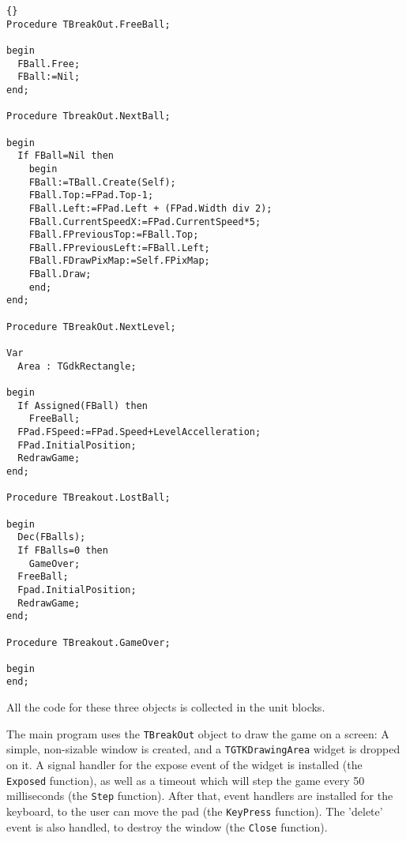 \documentclass[10pt]{article}
\newcommand{\file}[1]{\textsf{#1}}
\newcommand{\var}[1]{\texttt{#1}}
\begin{document}
\begin{lstlisting}{}
Procedure TBreakOut.FreeBall;

begin
  FBall.Free;
  FBall:=Nil;
end;

Procedure TbreakOut.NextBall;

begin
  If FBall=Nil then
    begin
    FBall:=TBall.Create(Self);
    FBall.Top:=FPad.Top-1;
    FBall.Left:=FPad.Left + (FPad.Width div 2);
    FBall.CurrentSpeedX:=FPad.CurrentSpeed*5;
    FBall.FPreviousTop:=FBall.Top;
    FBall.FPreviousLeft:=FBall.Left;
    FBall.FDrawPixMap:=Self.FPixMap;
    FBall.Draw;
    end;
end;

Procedure TBreakOut.NextLevel;

Var
  Area : TGdkRectangle;

begin
  If Assigned(FBall) then
    FreeBall;
  FPad.FSpeed:=FPad.Speed+LevelAccelleration;
  FPad.InitialPosition;
  RedrawGame;
end;

Procedure TBreakout.LostBall;

begin
  Dec(FBalls);
  If FBalls=0 then 
    GameOver;
  FreeBall;
  Fpad.InitialPosition;
  RedrawGame;
end;

Procedure TBreakout.GameOver;

begin
end;
\end{lstlisting}

All the code for these three objects is collected in the unit \file{blocks}.

The main program uses the \var{TBreakOut} object to draw the game on a screen:
A simple, non-sizable window is created, and a \var{TGTKDrawingArea} widget is
dropped on it. A signal handler for the expose event of the widget is installed 
(the \var{Exposed} function), as well as a timeout which will step the game 
every 50 milliseconds (the \var{Step} function). After that, event handlers 
are installed for the keyboard, to the user can move the pad 
(the \var{KeyPress} function). The 'delete' event is also handled, to destroy the
window (the \var{Close} function).
\end{document}
